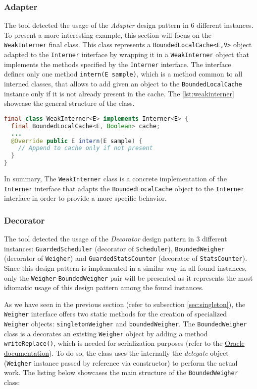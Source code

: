\subsubsection{Adapter}

The tool detected the usage of the \textit{Adapter} design pattern in 6 different instances. To present a more interesting example, this section will focus on the \texttt{WeakInterner} final class. This class represents a \texttt{BoundedLocalCache<E,V>} object adapted to the \texttt{Interner} interface by wrapping it in a \texttt{WeakInterner} object that implements the methods specified by the \texttt{Interner} interface. The interface defines only one method \texttt{intern(E sample)}, which is a method common to all interned classes, that allows to add given an object to the \texttt{BoundedLocalCache} instance only if it is not already present in the cache. The \autoref{lst:weakinterner} showcase the general structure of the class.

\begin{lstlisting}[language=Java, caption={\texttt{WeakInterner} adapter structure}, label={lst:weakinterner}]
final class WeakInterner<E> implements Interner<E> {
  final BoundedLocalCache<E, Boolean> cache;
  ...
  @Override public E intern(E sample) {
    // Append to cache only if not present
  }
}
\end{lstlisting}

\noindent In summary, The \texttt{WeakInterner} class is a concrete implementation of the \texttt{Interner} interface that adapts the \texttt{BoundedLocalCache} object to the \texttt{Interner} interface in order to provide a more specific behavior.

\subsubsection{Decorator}

The tool detected the usage of the \textit{Decorator} design pattern in 3 different instances: \texttt{GuardedScheduler} (decorator of \texttt{Scheduler}), \texttt{BoundedWeigher} (decorator of \texttt{Weigher}) and \texttt{GuardedStatsCounter} (decorator of \texttt{StatsCounter}). Since this design pattern is implemented in a similar way in all found instances, only the \texttt{Weigher}-\texttt{BoundedWeigher} pair will be presented as it represents the most idiomatic usage of this design pattern among the found instances.

As we have seen in the previous section (refer to subsection \ref{sec:singleton}), the \texttt{Weigher} interface offers two static methods for the creation of specialized \texttt{Weigher} objects: \texttt{singletonWeigher} and \texttt{boundedWeigher}. The \texttt{BoundedWeigher} class is a decorates an existing \texttt{Weigher} object by adding a method \texttt{writeReplace()}, which is needed for serialization purposes (refer to the \href{https://docs.oracle.com/javase//7/docs/technotes/guides/serialization/examples/symbol/index3.html}{Oracle documentation}). To do so, the class uses the internally the \textit{delegate} object (\texttt{Weigher} instance passed by reference via constructor) to perform the actual work. The listing below showcases the main structure of the \texttt{BoundedWeigher} class:

